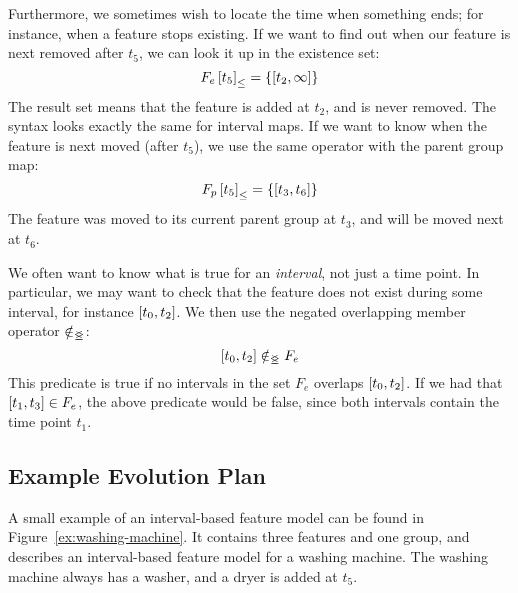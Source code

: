 Furthermore, we sometimes wish to locate the time when something ends; for instance, when a feature stops existing. If we want to find out when our feature is next removed after $t_5$, we can look it up in the existence set:
\[
  \containing{F_e}{t_5} = \set{\interval{t_2}{\forever}}
\]
The result set means that the feature is added at $t_2$, and is never removed. The syntax looks exactly the same for interval maps. If we want to know when the feature is next moved (after $t_5$), we use the same operator with the parent group map:
\[
  \containing{F_p}{t_5} = \set{\interval{t_3}{t_6}}
\]
The feature was moved to its current parent group at $t_3$, and will be moved next at $t_6$.

We often want to know what is true for an \emph{interval}, not just a time point. In particular, we may want to check that the feature does not exist during some interval, for instance $\interval{t_0}{t_2}$. We then use the negated overlapping member operator $\notin_{\leq\!\!\!\!\geq{}}$:
\[
  \interval{t_0}{t_2} \notinnr F_e
\]
This predicate is true if no intervals in the set $F_e$ overlaps $\interval{t_0}{t_2}$. If we had that $\interval{t_1}{t_3} \in F_e$, the above predicate would be false, since both intervals contain the time point $t_1$.

\subsection{Example Evolution Plan}
A small example of an interval-based feature model can be found in Figure~\vref{ex:washing-machine}. It contains three features and one group, and describes an interval-based feature model for a washing machine. The washing machine always has a washer, and a dryer is added at $t_5$. 

